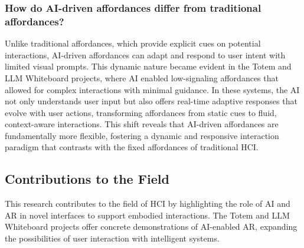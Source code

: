 \subsubsection{How do AI-driven affordances differ from traditional affordances?}
Unlike traditional affordances, which provide explicit cues on potential interactions, AI-driven affordances can adapt and respond to user intent with limited visual prompts.
This dynamic nature became evident in the Totem and LLM Whiteboard projects, where AI enabled low-signaling affordances that allowed for complex interactions with minimal guidance.
In these systems, the AI not only understands user input but also offers real-time adaptive responses that evolve with user actions, transforming affordances from static cues to fluid, context-aware interactions.
This shift reveals that AI-driven affordances are fundamentally more flexible, fostering a dynamic and responsive interaction paradigm that contrasts with the fixed affordances of traditional HCI.


\subsection{Contributions to the Field}

This research contributes to the field of HCI by highlighting the role of AI and AR in novel interfaces to support embodied interactions.
The Totem and LLM Whiteboard projects offer concrete demonstrations of AI-enabled AR, expanding the possibilities of user interaction with intelligent systems.


